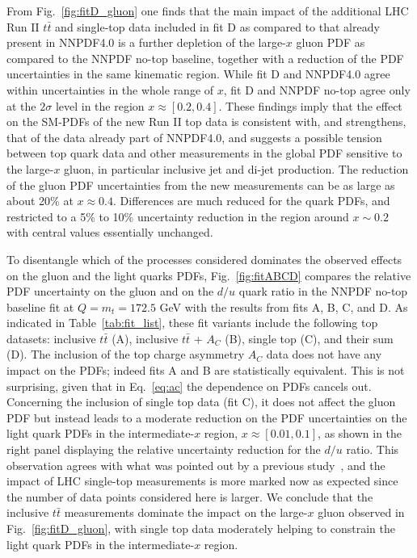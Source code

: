 \documentclass[withindex,glossary]{cam-thesis}
\begin{document}
%
From Fig.~\ref{fig:fitD_gluon} one finds that the main impact of the
additional LHC Run II $t\bar{t}$ and single-top data included in fit D as compared to that
already present in NNPDF4.0 is a further depletion of the large-$x$ gluon
PDF as compared to the NNPDF no-top baseline, together with a reduction of
the PDF uncertainties in the same kinematic region.
%
While fit D and NNPDF4.0 agree within uncertainties in the whole range of $x$,
fit D and NNPDF no-top agree only at the $2\sigma$ level
in the region $x\approx [0.2,0.4]$.
%
These findings imply that the effect on the SM-PDFs of the new Run II top
data is consistent with, and strengthens, that of the data already part of
NNPDF4.0, and suggests a possible tension
between top quark data and other measurements in the global PDF sensitive
to the large-$x$ gluon, in particular inclusive jet and di-jet production.
%
The reduction of the gluon PDF uncertainties from the new measurements
can be as large as about 20\% at $x\approx 0.4$.
%
Differences are much reduced for the quark PDFs, and restricted
to a 5\% to 10\% uncertainty reduction in the region around $x\sim 0.2$
with central values essentially unchanged.

To disentangle which of the processes
considered dominates the observed effects on the gluon and the light
quarks PDFs, Fig.~\ref{fig:fitABCD} compares the relative PDF uncertainty
on the gluon and on the $d/u$ quark ratio in the NNPDF no-top 
baseline fit at $Q=m_t=172.5$ GeV with the results from fits A, B, C, and D.
%
As indicated in Table~\ref{tab:fit_list}, these fit variants include the following top datasets:  inclusive $t\bar{t}$ (A),
inclusive $t\bar{t}$ + $A_C$ (B), single top (C), and their sum (D).
%
The inclusion of the top charge asymmetry $A_C$ data does not have any
impact on the PDFs; indeed fits A and B are statistically equivalent.
%
This is not surprising, given that in Eq.~\eqref{eq:ac} the dependence
on PDFs cancels out.
%
Concerning the inclusion of single top data (fit C), it does not affect
the gluon PDF but instead leads to a moderate reduction on the PDF
uncertainties on the light quark PDFs in the intermediate-$x$ region,
$x\approx[0.01,0.1]$, as shown in the right panel
displaying the relative uncertainty reduction for the $d/u$ ratio.
%
This observation agrees with what was pointed out by a previous
study~\cite{Nocera:2019wyk}, and the impact of  LHC single-top
measurements is more marked now
as expected since the number of data points considered here is larger.
%
We conclude that the inclusive $t\bar{t}$ measurements dominate
the impact on the large-$x$ gluon observed in Fig.~\ref{fig:fitD_gluon}, with
single top data moderately helping to constrain the light quark PDFs
in the intermediate-$x$ region. 
\end{document}
